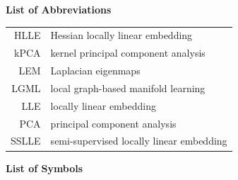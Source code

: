 \documentclass[12pt]{article}
\newcommand{\mani}{\mathcal{M}}
\newcommand{\N}{\mathbb{N}}
\newcommand{\RD}{\mathbb{R}^D}
\newcommand{\Rd}{\mathbb{R}^d}
\newcommand{\X}{\mathcal{X}}
\newcommand{\Y}{\mathcal{Y}}
\begin{document}
% 

\tableofcontents
\newpage

\Large
\noindent
\textbf{List of Abbreviations}
\vspace{0.5cm} \\
\noindent
\normalsize


\begin{tabular}{rl}
  HLLE & Hessian locally linear embedding \\
  kPCA & kernel principal component analysis \\
  LEM & Laplacian eigenmaps \\
  LGML & local graph-based manifold learning \\
  LLE & locally linear embedding \\
  PCA & principal component analysis \\
  SSLLE & semi-supervised locally linear embedding
\end{tabular}

\vspace{3cm}

\Large
\noindent
\textbf{List of Symbols}
\vspace{0.5cm} \\
\noindent
\normalsize

\end{document}
